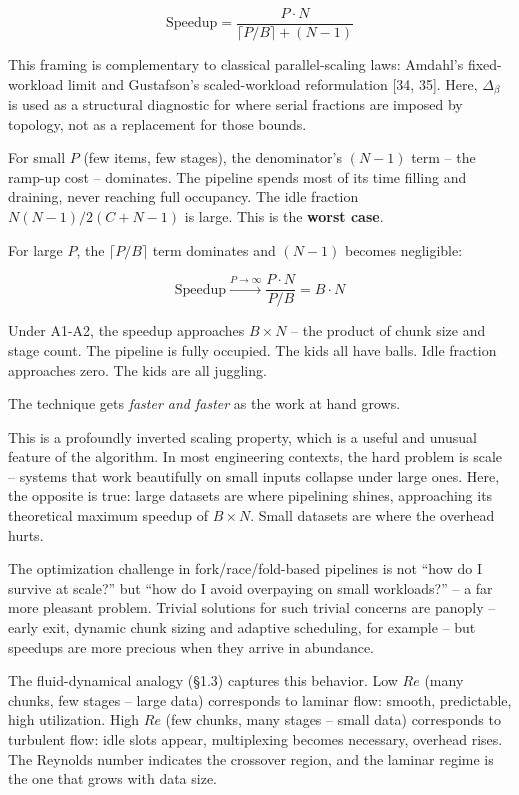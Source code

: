 \documentclass[
  11pt,
]{article}
\begin{document}
\[
\text{Speedup} = \frac{P \cdot N}{\lceil P/B \rceil + (N - 1)}
\]

This framing is complementary to classical parallel-scaling laws:
Amdahl's fixed-workload limit and Gustafson's scaled-workload
reformulation {[}34, 35{]}. Here, \(\Delta_\beta\) is used as a
structural diagnostic for where serial fractions are imposed by
topology, not as a replacement for those bounds.

For small \(P\) (few items, few stages), the denominator's \((N-1)\)
term -- the ramp-up cost -- dominates. The pipeline spends most of its
time filling and draining, never reaching full occupancy. The idle
fraction \(N(N-1)/2(C+N-1)\) is large. This is the \textbf{worst case}.

For large \(P\), the \(\lceil P/B \rceil\) term dominates and \((N-1)\)
becomes negligible:

\[
\text{Speedup} \xrightarrow{P \to \infty} \frac{P \cdot N}{P/B} = B \cdot N
\]

Under A1-A2, the speedup approaches \(B \times N\) -- the product of
chunk size and stage count. The pipeline is fully occupied. The kids all
have balls. Idle fraction approaches zero. The kids are all juggling.

The technique gets \emph{faster and faster} as the work at hand grows.

This is a profoundly inverted scaling property, which is a useful and
unusual feature of the algorithm. In most engineering contexts, the hard
problem is scale -- systems that work beautifully on small inputs
collapse under large ones. Here, the opposite is true: large datasets
are where pipelining shines, approaching its theoretical maximum speedup
of \(B \times N\). Small datasets are where the overhead hurts.

The optimization challenge in fork/race/fold-based pipelines is not
``how do I survive at scale?'' but ``how do I avoid overpaying on small
workloads?'' -- a far more pleasant problem. Trivial solutions for such
trivial concerns are panoply -- early exit, dynamic chunk sizing and
adaptive scheduling, for example -- but speedups are more precious when
they arrive in abundance.

The fluid-dynamical analogy (§1.3) captures this behavior. Low \(Re\)
(many chunks, few stages -- large data) corresponds to laminar flow:
smooth, predictable, high utilization. High \(Re\) (few chunks, many
stages -- small data) corresponds to turbulent flow: idle slots appear,
multiplexing becomes necessary, overhead rises. The Reynolds number
indicates the crossover region, and the laminar regime is the one that
grows with data size.
\end{document}
